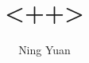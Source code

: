 \documentclass[a4paper]{article}
\begin{document}
\title{<++>}
\author{Ning Yuan}
\maketitle

\printbibliography
\end{document}
